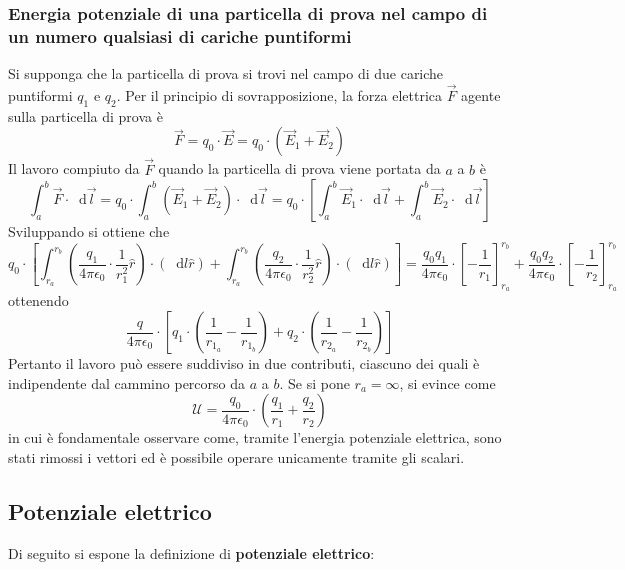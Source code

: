 \documentclass[a4paper]{extarticle}
\newcommand\dif{\mathop{}\!\mathrm{d}}
\begin{document}
\vspace{1em}
\subsubsection{Energia potenziale di una particella di prova nel campo di un numero qualsiasi di cariche puntiformi}
Si supponga che la particella di prova si trovi nel campo di due cariche puntiformi $q_1$ e $q_2$. Per il principio di sovrapposizione, la forza elettrica $\vec F$ agente sulla particella di prova è
\[\vec F = q_0 \cdot \vec E = q_0 \cdot \left(\vec{E}_1+\vec{E}_2\right)\]
Il lavoro compiuto da $\vec F$ quando la particella di prova viene portata da $a$ a $b$ è
\[\int_a^b \vec F \cdot \dif \vec l = q_0 \cdot \int_a^b (\vec{E}_1+\vec{E}_2) \cdot \dif \vec l = q_0 \cdot \left[\int_a^b \vec{E}_1 \cdot \dif \vec l + \int_a^b \vec{E}_2 \cdot \dif \vec l \right]\]
Sviluppando si ottiene che
\[q_0 \cdot \left[\int_{r_a}^{r_b} \left(\frac{q_1}{4 \pi \epsilon_0} \cdot \frac{1}{r_1^2} \hat r \right) \cdot (\dif l \hat r) + \int_{r_a}^{r_b} \left(\frac{q_2}{4 \pi \epsilon_0} \cdot \frac{1}{r_2^2} \hat{r} \right) \cdot \left(\dif l \hat{r} \right) \right] = \frac{q_0q_1}{4 \pi \epsilon_0} \cdot \left[-\frac{1}{r_1}\right]_{r_a}^{r_b} + \frac{q_0q_2}{4 \pi \epsilon_0} \cdot \left[-\frac{1}{r_2}\right]_{r_a}^{r_b}\]
ottenendo
\[\frac{q}{4 \pi \epsilon_0} \cdot \left[ q_1 \cdot \left(\frac{1}{r_{1_a}} - \frac{1}{r_{1_b}}\right) + q_2 \cdot \left(\frac{1}{r_{2_a}} - \frac{1}{r_{2_b}}\right)\right]\]
Pertanto il lavoro può essere suddiviso in due contributi, ciascuno dei quali è indipendente dal cammino percorso da $a$ a $b$. Se si pone $r_a=\infty$, si evince come
\[\boxed{\mathcal{U}=\frac{q_0}{4 \pi \epsilon_0} \cdot \left(\frac{q_1}{r_1} + \frac{q_2}{r_2}\right)}\]
in cui è fondamentale osservare come, tramite l'energia potenziale elettrica, sono stati rimossi i vettori ed è possibile operare unicamente tramite gli scalari.

\newpage
\noindent
\subsection{Potenziale elettrico}
Di seguito si espone la definizione di \textbf{potenziale elettrico}:
\end{document}
